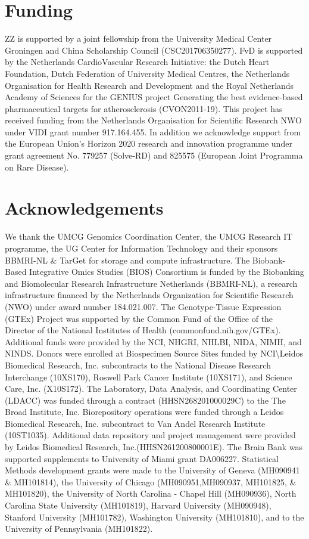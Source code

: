 \documentclass{book}
\begin{document}
\begin{refsection}
\section*{Funding}
ZZ is supported by a joint fellowship from the University Medical Center Groningen and China Scholarship Council (CSC201706350277).
FvD is supported by the Netherlands CardioVascular Research Initiative: the Dutch Heart Foundation, Dutch Federation of University Medical Centres, the Netherlands Organisation for Health Research and Development and the Royal Netherlands Academy of Sciences for the GENIUS project Generating the best evidence-based pharmaceutical targets for atherosclerosis (CVON2011-19).
This project has received funding from the Netherlands Organisation for Scientific Research NWO under VIDI grant number 917.164.455.
In addition we acknowledge support from the European Union's Horizon 2020 research and innovation programme under grant agreement No. 779257 (Solve-RD) and 825575 (European Joint Programma on Rare Disease).

\section*{Acknowledgements}
We thank the UMCG Genomics Coordination Center, the UMCG Research IT programme, the UG Center for Information Technology and their sponsors BBMRI-NL \& TarGet for storage and compute infrastructure.
The Biobank-Based Integrative Omics Studies (BIOS) Consortium is funded by the Biobanking and Biomolecular Research Infrastructure Netherlands (BBMRI-NL), a research infrastructure financed by the Netherlands Organization for Scientific Research (NWO) under award number 184.021.007.
The Genotype-Tissue Expression (GTEx) Project was supported by the Common Fund of the Office of the Director of the National Institutes of Health (commonfund.nih.gov/GTEx).
Additional funds were provided by the NCI, NHGRI, NHLBI, NIDA, NIMH, and NINDS.
Donors were enrolled at Biospecimen Source Sites funded by NCI\textbackslash Leidos Biomedical Research, Inc. subcontracts to the National Disease Research Interchange (10XS170), Roswell Park Cancer Institute (10XS171), and Science Care, Inc. (X10S172).
The Laboratory, Data Analysis, and Coordinating Center (LDACC) was funded through a contract (HHSN268201000029C) to the The Broad Institute, Inc.
Biorepository operations were funded through a Leidos Biomedical Research, Inc. subcontract to Van Andel Research Institute (10ST1035).
Additional data repository and project management were provided by Leidos Biomedical Research, Inc.(HHSN261200800001E).
The Brain Bank was supported supplements to University of Miami grant DA006227.
Statistical Methods development grants were made to the University of Geneva (MH090941 \& MH101814), the University of Chicago (MH090951,MH090937, MH101825, \& MH101820), the University of North Carolina - Chapel Hill (MH090936), North Carolina State University (MH101819), Harvard University (MH090948), Stanford University (MH101782), Washington University (MH101810), and to the University of Pennsylvania (MH101822).


\end{refsection}
\end{document}
